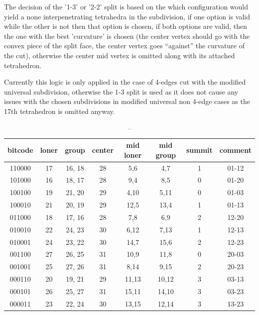 The decision of the '1-3' or '2-2' split is based on the which configuration would yield a none interpenetrating tetrahedra in the subdivision, if one option is valid while the other is not then that option is chosen, if both options are valid, then the one with the best 'curvature' is chosen (the center vertex should go with the convex piece of the split face, the center vertex goes \enquote{against} the curvature of the cut), otherwise the center mid vertex is omitted along with its attached tetrahedron.

Currently this logic is only applied in the case of 4-edges cut with the modified universal subdivision, otherwise the 1-3 split is used as it does not cause any issues with the chosen subdivisions in modified universal non 4-edge cases as the 17th tetrahedron is omitted anyway.


\begin{table}[]
\begin{tabular}{|c|c|c|c|c|c|c|c|}
\hline
bitcode & loner & group  & center & mid loner & mid group & summit & comment \\ \hline
110000  & 17    & 16, 18 & 28     & 5,6       & 4,7       & 1      & 01-12   \\ \hline
101000  & 16    & 18, 17 & 28     & 9,4       & 8,5       & 0      & 01-20   \\ \hline
100100  & 19    & 21, 20 & 29     & 4,10      & 5,11      & 0      & 01-03   \\ \hline
100010  & 21    & 20, 19 & 29     & 12,5      & 13,4      & 1      & 01-13   \\ \hline
011000  & 18    & 17, 16 & 28     & 7,8       & 6,9       & 2      & 12-20   \\ \hline
010010  & 22    & 24, 23 & 30     & 6,12      & 7,13      & 1      & 12-13   \\ \hline
010001  & 24    & 23, 22 & 30     & 14,7      & 15,6      & 2      & 12-23   \\ \hline
001100  & 27    & 26, 25 & 31     & 10,9      & 11,8      & 0      & 20-03   \\ \hline
001001  & 25    & 27, 26 & 31     & 8,14      & 9,15      & 2      & 20-23   \\ \hline
000110  & 20    & 19, 21 & 29     & 11,13     & 10,12     & 3      & 03-13   \\ \hline
000101  & 26    & 25, 27 & 31     & 15,11     & 14,10     & 3      & 03-23   \\ \hline
000011  & 23    & 22, 24 & 30     & 13,15     & 12,14     & 3      & 13-23   \\ \hline
\end{tabular}
\caption{--}
\end{table}








